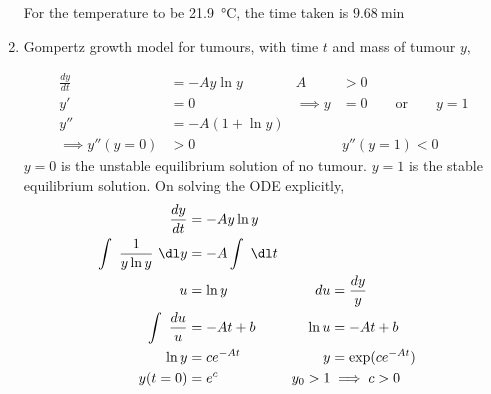 \begin{enumerate}
          For the temperature to be \SI{21.9}{\celsius}, the time taken is $ \SI{9.68}{\minute} $

    \item Gompertz growth model for tumours, with time $ t $ and mass of tumour $ y $,

          \begin{align}
              \frac{dy}{dt}       & = -Ay\ln y      & A          & >0                                  \\
              y'                  & = 0             & \implies y & = 0 \qquad \mathrm{or} \qquad y = 1 \\
              y''                 & = -A(1 + \ln y)                                                    \\
              \implies y''(y = 0) & >0              &            & y''(y = 1)< 0
          \end{align}
          $ y = 0 $ is the unstable equilibrium solution of no tumour. $ y = 1 $ is the stable equilibrium solution. On solving the ODE explicitly,
          \begin{align}
              \frac{dy}{dt}                 & = -Ay \ln y                                     \\
              \int\ \frac{1}{y\ln y}\ \dl y & = -A \int\ \dl t                                \\
              u                             & = \ln y          & du        & = \frac{dy}{y}   \\
              \int\ \frac{du}{u}            & = -At + b        & \ln u     & = -At + b        \\
              \ln y                         & = ce^{-At}       & y         & = \exp(ce^{-At}) \\
              y(t = 0)                      & = e^{c}          & y_{0} > 1 & \implies c > 0
          \end{align}


\end{enumerate}
